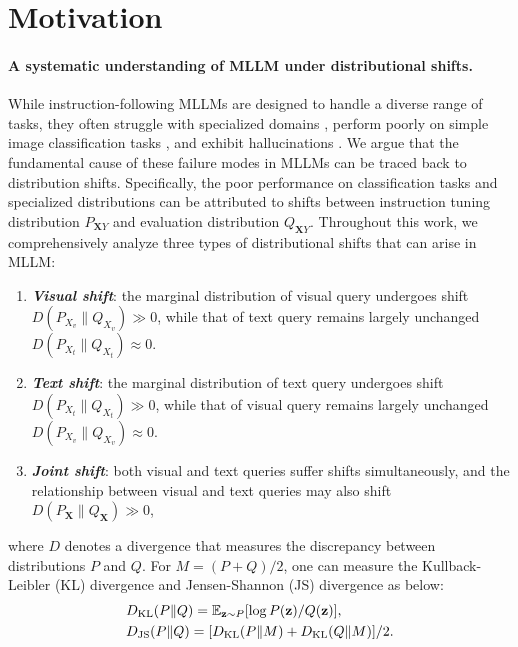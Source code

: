 \section{Motivation} \label{sec:motivation}

\paragraph{A systematic understanding of MLLM under distributional shifts.} While instruction-following MLLMs are designed to handle a diverse range of tasks, they often struggle with specialized domains \cite{zhang2024out, zhou2024adapting}, perform poorly on simple image classification tasks \cite{zhai2024investigating, zhang2024vlmclf}, and exhibit hallucinations \cite{li2023evaluating, ye2025beaf}. We argue that {the fundamental cause of these failure modes in MLLMs can be traced back to distribution shifts}. Specifically, the poor performance on classification tasks and specialized distributions can be attributed to shifts between instruction tuning distribution $P_{\mathbf{X}Y}$ and evaluation distribution $Q_{\mathbf{X}Y}$.
Throughout this work, we comprehensively analyze three types of distributional shifts that can arise in MLLM:


\begin{enumerate}
    \item \textit{\textbf{Visual shift}}: the marginal distribution of visual query undergoes shift $D(P_{X_{v}}\|Q_{X_{v}}) \gg 0$, while that of text query remains largely unchanged $D(P_{X_{t}}\|Q_{X_{t}}) \approx 0$.
    \item \textit{\textbf{Text shift}}: the marginal distribution of text query undergoes shift $D(P_{X_{t}}\|Q_{X_{t}}) \gg 0$, while that of visual query remains largely unchanged $D(P_{X_{v}}\|Q_{X_{v}})\approx 0$.
    \item \textit{\textbf{Joint shift}}: both visual and text queries suffer shifts simultaneously, and the relationship between visual and text queries may also shift $D(P_{\mathbf{X}}\|Q_{\mathbf{X}}) \gg 0$,
\end{enumerate}
where $D$ denotes a divergence that measures the discrepancy between distributions $P$ and $Q$. For $M=(P+Q)/2$, one can measure the Kullback-Leibler (KL) divergence and Jensen-Shannon (JS) divergence as below:
\begin{equation*}
    \begin{split}
       & D_{\rm KL}(P\|Q)= \mathbb{E}_{\mathbf{z}\sim P} [\log {P(\mathbf{z})}/{Q(\mathbf{z})}],\\ 
       &D_{\rm JS}(P\|Q)= [{D_{\rm KL}(P\|M)+D_{\rm KL}(Q\|M)}]/2.
    \end{split}
\end{equation*}


